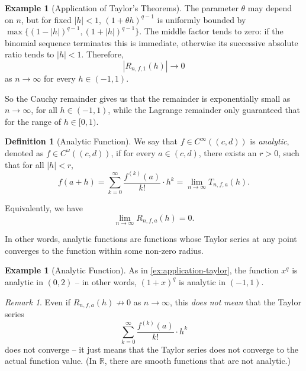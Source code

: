 \documentclass[11pt]{article}
\numberwithin{equation}{section}
\theoremstyle{definition}
\newtheorem{definition}[theorem]{Definition}
\newtheorem{example}[theorem]{Example}
\theoremstyle{remark}
\newtheorem{remark}[theorem]{Remark}
\newcommand{\pqty}[1]{\left(#1\right)}
\newcommand{\abs}[1]{\left|#1\right|}
\newcommand{\oointv}[2]{(#1,#2)}
\newcommand{\cointv}[2]{[#1,#2)}
\newcommand{\RR}{\mathbb R}
\newcommand{\smoothClass}{C^\infty}
\newcommand{\analyticClass}{C^\omega}
\newcommand{\notto}{\not\to}
\begin{document}
\begin{example}[Application of Taylor's Theorems]
    The parameter \(\theta\) may depend on \(n\), but for fixed \(|h|<1\),
\((1+\theta h)^{q-1}\) is uniformly bounded by
\(\max\{(1-|h|)^{q-1},(1+|h|)^{q-1}\}\).
The middle factor tends to zero: if the binomial sequence terminates this is
immediate, otherwise its successive absolute ratio tends to \(|h|<1\).
Therefore,
    \[
        \abs{R_{n, f, 1} \pqty{h}} \to 0
    \]
    as \(n \to \infty\) for every \(h \in \oointv{-1}{1}\).
    
    So the Cauchy remainder gives us that the remainder is exponentially small as \(n \to \infty\), for all \(h \in \oointv{-1}{1}\), while the Lagrange remainder only guaranteed that for the range of \(h \in \cointv{0}{1}\).
\end{example}

\begin{definition}[Analytic Function]\label{analysis-unit-0133}
    \label{def:analytic}%
    We say that \(f \in \smoothClass \pqty{\oointv{c}{d}}\) is \emph{analytic}, denoted as \(f \in \analyticClass \pqty{\oointv{c}{d}}\), if for every \(a \in \oointv{c}{d}\), there exists an \(r > 0\), such that for all \(\abs{h} < r\),
    \[
        f\pqty{a + h} = \sum_{k = 0}^{\infty} \frac{f^{\pqty{k}} \pqty{a}}{k!} \cdot h^k = \lim_{n \to \infty} T_{n, f, a} \pqty{h}.
    \]

    Equivalently, we have
    \[
        \lim_{n \to \infty} R_{n, f, a} \pqty{h} = 0.
    \]

    In other words, analytic functions are functions whose Taylor series at any point converges to the function within some non-zero radius.
\end{definition}

\begin{example}[Analytic Function]\label{analysis-unit-0134}
    \label{ex:analytic-fn}%
    As in \autoref{ex:application-taylor}, the function \(x^q\) is analytic in \(\oointv{0}{2}\) -- in other words, \(\pqty{1 + x}^q\) is analytic in \(\oointv{-1}{1}\).
\end{example}

\begin{remark}\label{analysis-unit-0135}
    Even if \(R_{n, f, a} \pqty{h} \notto 0\) as \(n \to \infty\), this \emph{does not mean} that the Taylor series
    \[
        \sum_{k = 0}^{\infty} \frac{f^{\pqty{k}} \pqty{a}}{k!} \cdot h^k
    \]
    does not converge -- it just means that the Taylor series does not converge to the actual function value. (In \(\RR\), there are smooth functions that are not analytic.)
\end{remark}
\end{document}
